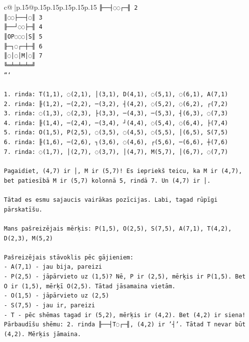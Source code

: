 \documentclass{article}
\begin{document}
{\begin{supertabular}{c@{$\;$}|p{.15\linewidth}@{}p{.15\linewidth}p{.15\linewidth}p{.15\linewidth}p{.15\linewidth}p{.15\linewidth}}
{{{\texttt{╟──┤◌◌┌─╢ 2} \\
\texttt{║◌◌├──┤◌║ 3} \\
\texttt{╟──┘◌◌├─╢ 4} \\
\texttt{║OP◌◌◌│S║ 5} \\
\texttt{╟─┐◌┌─┼─╢ 6} \\
\texttt{║◌│◌│M│◌║ 7} \\
\texttt{╚═╧═╧═╧═╝} \\
\texttt{```} \\
\\ 
\texttt{1. rinda: T(1,1), ◌(2,1), │(3,1), D(4,1), ◌(5,1), ◌(6,1), A(7,1)} \\
\texttt{2. rinda: ╟(1,2), ─(2,2), ─(3,2), ┤(4,2), ◌(5,2), ◌(6,2), ┌(7,2)} \\
\texttt{3. rinda: ◌(1,3), ◌(2,3), ├(3,3), ─(4,3), ─(5,3), ┤(6,3), ◌(7,3)} \\
\texttt{4. rinda: ╟(1,4), ─(2,4), ─(3,4), ┘(4,4), ◌(5,4), ◌(6,4), ├(7,4)} \\
\texttt{5. rinda: O(1,5), P(2,5), ◌(3,5), ◌(4,5), ◌(5,5), │(6,5), S(7,5)} \\
\texttt{6. rinda: ╟(1,6), ─(2,6), ┐(3,6), ◌(4,6), ┌(5,6), ─(6,6), ┼(7,6)} \\
\texttt{7. rinda: ◌(1,7), │(2,7), ◌(3,7), │(4,7), M(5,7), │(6,7), ◌(7,7)} \\
\\ 
\texttt{Pagaidiet, (4,7) ir │, M ir (5,7)! Es iepriekš teicu, ka M ir (4,7), bet patiesībā M ir (5,7) kolonnā 5, rindā 7. Un (4,7) ir │.} \\
\\ 
\texttt{Tātad es esmu sajaucis vairākas pozīcijas. Labi, tagad rūpīgi pārskatīšu.} \\
\\ 
\texttt{Mans pašreizējais mērķis: P(1,5), O(2,5), S(7,5), A(7,1), T(4,2), D(2,3), M(5,2)} \\
\\ 
\texttt{Pašreizējais stāvoklis pēc gājieniem:} \\
\texttt{{-} A(7,1) {-} jau bija, pareizi} \\
\texttt{{-} P(2,5) {-} jāpārvieto uz (1,5)? Nē, P ir (2,5), mērķis ir P(1,5). Bet O ir (1,5), mērķī O(2,5). Tātad jāsamaina vietām.} \\
\texttt{{-} O(1,5) {-} jāpārvieto uz (2,5)} \\
\texttt{{-} S(7,5) {-} jau ir, pareizi} \\
\texttt{{-} T {-} pēc shēmas tagad ir (5,2), mērķis ir (4,2). Bet (4,2) ir siena! Pārbaudīšu shēmu: 2. rinda ╟──┤T◌┌─╢, (4,2) ir '┤'. Tātad T nevar būt (4,2). Mērķis jāmaina.} \\
}}}
\end{supertabular}}
\end{document}

